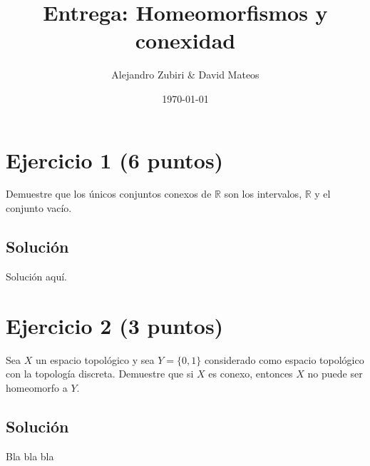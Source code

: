 \documentclass{amsbook}
\author{Alejandro Zubiri \& David Mateos}
\date{\today}
\title{Entrega: Homeomorfismos y conexidad}
\begin{document}
\maketitle
\section{Ejercicio 1 (6 puntos)}
Demuestre que los únicos conjuntos conexos de \(\mathbb{R}\) son los intervalos, \(\mathbb{R}\) y el
conjunto vacío.\\
\subsection{Solución}
Solución aquí.
\section{Ejercicio 2 (3 puntos)}
Sea \(X\) un espacio topológico y sea \(Y = \{ 0,1 \}\) considerado como espacio
topológico con la topología discreta. Demuestre que si \(X\) es conexo, entonces
\(X\) no puede ser homeomorfo a \(Y\).\\
\subsection{Solución}
Bla bla bla
\end{document}
